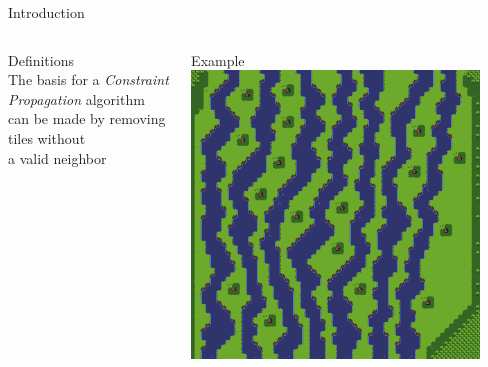 \documentclass{beamer}
\begin{document}
  \begin{frame}[fragile]{Introduction}
    \begin{columns}[T,onlytextwidth]
        \begin{block}{Definitions}
          \hfill \\
          The basis for a \textit{Constraint Propagation} algorithm
          can be made by removing tiles without \\
          a valid neighbor
        \end{block}
        \begin{block}{Example}
          \includegraphics[width=0.9\textwidth]{img/forestmicro_64x64.pdf}
        \end{block}
    \end{columns}
  \end{frame}


\end{document}
